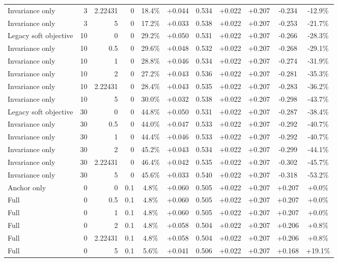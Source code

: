 \begin{table}[htbp]
\begin{tabular}{lrrrccccccc}
Invariance only & 3 & 2.22431 & 0 & 18.4\% & +0.044 & 0.534 & +0.022 & +0.207 & -0.234 & -12.9\% \\
Invariance only & 3 & 5 & 0 & 17.2\% & +0.033 & 0.538 & +0.022 & +0.207 & -0.253 & -21.7\% \\
Legacy soft objective & 10 & 0 & 0 & 29.2\% & +0.050 & 0.531 & +0.022 & +0.207 & -0.266 & -28.3\% \\
Invariance only & 10 & 0.5 & 0 & 29.6\% & +0.048 & 0.532 & +0.022 & +0.207 & -0.268 & -29.1\% \\
Invariance only & 10 & 1 & 0 & 28.8\% & +0.046 & 0.534 & +0.022 & +0.207 & -0.274 & -31.9\% \\
Invariance only & 10 & 2 & 0 & 27.2\% & +0.043 & 0.536 & +0.022 & +0.207 & -0.281 & -35.3\% \\
Invariance only & 10 & 2.22431 & 0 & 28.4\% & +0.043 & 0.535 & +0.022 & +0.207 & -0.283 & -36.2\% \\
Invariance only & 10 & 5 & 0 & 30.0\% & +0.032 & 0.538 & +0.022 & +0.207 & -0.298 & -43.7\% \\
Legacy soft objective & 30 & 0 & 0 & 44.8\% & +0.050 & 0.531 & +0.022 & +0.207 & -0.287 & -38.4\% \\
Invariance only & 30 & 0.5 & 0 & 44.0\% & +0.047 & 0.533 & +0.022 & +0.207 & -0.292 & -40.7\% \\
Invariance only & 30 & 1 & 0 & 44.4\% & +0.046 & 0.533 & +0.022 & +0.207 & -0.292 & -40.7\% \\
Invariance only & 30 & 2 & 0 & 45.2\% & +0.043 & 0.534 & +0.022 & +0.207 & -0.299 & -44.1\% \\
Invariance only & 30 & 2.22431 & 0 & 46.4\% & +0.042 & 0.535 & +0.022 & +0.207 & -0.302 & -45.7\% \\
Invariance only & 30 & 5 & 0 & 45.6\% & +0.033 & 0.540 & +0.022 & +0.207 & -0.318 & -53.2\% \\
Anchor only & 0 & 0 & 0.1 & 4.8\% & +0.060 & 0.505 & +0.022 & +0.207 & +0.207 & +0.0\% \\
Full & 0 & 0.5 & 0.1 & 4.8\% & +0.060 & 0.505 & +0.022 & +0.207 & +0.207 & +0.0\% \\
Full & 0 & 1 & 0.1 & 4.8\% & +0.060 & 0.505 & +0.022 & +0.207 & +0.207 & +0.0\% \\
Full & 0 & 2 & 0.1 & 4.8\% & +0.058 & 0.504 & +0.022 & +0.207 & +0.206 & +0.8\% \\
Full & 0 & 2.22431 & 0.1 & 4.8\% & +0.058 & 0.504 & +0.022 & +0.207 & +0.206 & +0.8\% \\
Full & 0 & 5 & 0.1 & 5.6\% & +0.041 & 0.506 & +0.022 & +0.207 & +0.168 & +19.1\% \\

\end{tabular}
\end{table}
